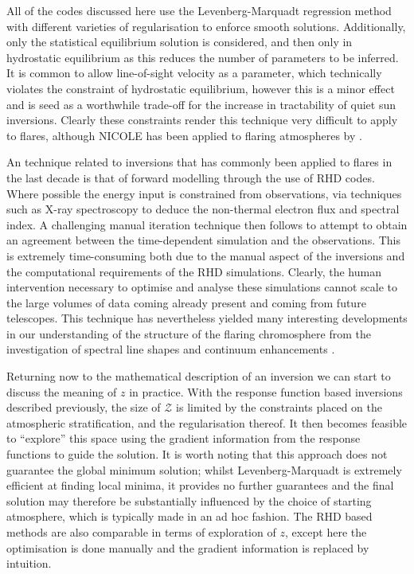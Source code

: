 All of the codes discussed here use the Levenberg-Marquadt regression method with different varieties of regularisation to enforce smooth solutions.
Additionally, only the statistical equilibrium solution is considered, and then only in hydrostatic equilibrium as this reduces the number of parameters to be inferred.
It is common to allow line-of-sight velocity as a parameter, which technically violates the constraint of hydrostatic equilibrium, however this is a minor effect and is seed as a worthwhile trade-off for the increase in tractability of quiet sun inversions.
Clearly these constraints render this technique very difficult to apply to flares, although NICOLE has been applied to flaring atmospheres by \citet{Kuridze2018}.

An technique related to inversions that has commonly been applied to flares in the last decade is that of forward modelling through the use of RHD codes.
Where possible the energy input is constrained from observations, via techniques such as X-ray spectroscopy to deduce the non-thermal electron flux and spectral index.
A challenging manual iteration technique then follows to attempt to obtain an agreement between the time-dependent simulation and the observations.
This is extremely time-consuming both due to the manual aspect of the inversions and the computational requirements of the RHD simulations.
Clearly, the human intervention necessary to optimise and analyse these simulations cannot scale to the large volumes of data coming already present and coming from future telescopes.
This technique has nevertheless yielded many interesting developments in our understanding of the structure of the flaring chromosphere from the investigation of spectral line shapes and continuum enhancements \citep{Kuridze2015,RubioDaCosta2016, Kowalski2017,Simoes2017}.

Returning now to the mathematical description of an inversion we can start to discuss the meaning of $z$ in practice.
With the response function based inversions described previously, the size of $\mathcal{Z}$ is limited by the constraints placed on the atmospheric stratification, and the regularisation thereof.
It then becomes feasible to ``explore'' this space using the gradient information from the response functions to guide the solution.
It is worth noting that this approach does not guarantee the global minimum solution; whilst Levenberg-Marquadt is extremely efficient at finding local minima, it provides no further guarantees and the final solution may therefore be substantially influenced by the choice of starting atmosphere, which is typically made in an ad hoc fashion.
The RHD based methods are also comparable in terms of exploration of $z$, except here the optimisation is done manually and the gradient information is replaced by intuition.

